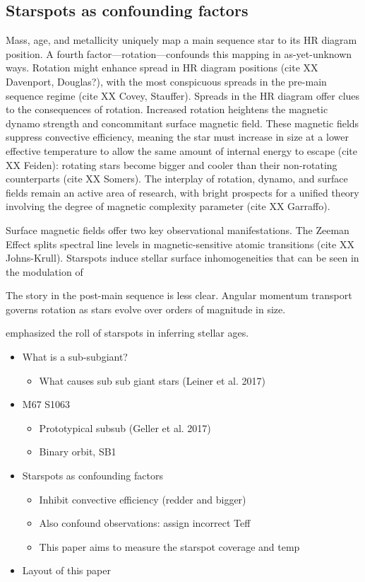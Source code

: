 \documentclass[twocolumn]{emulateapj}%
\begin{document}
\subsection{Starspots as confounding factors}
Mass, age, and metallicity uniquely map a main sequence star to its HR diagram position.  A fourth factor---rotation---confounds this mapping in as-yet-unknown ways.  Rotation might enhance spread in HR diagram positions (cite XX Davenport, Douglas?), with the most conspicuous spreads in the pre-main sequence regime (cite XX Covey, Stauffer).  Spreads in the HR diagram offer clues to the consequences of rotation.  Increased rotation heightens the magnetic dynamo strength and concommitant surface magnetic field.  These magnetic fields suppress convective efficiency, meaning the star must increase in size at a lower effective temperature to allow the same amount of internal energy to escape (cite XX Feiden): rotating stars become bigger and cooler than their non-rotating counterparts (cite XX Somers).  The interplay of rotation, dynamo, and surface fields remain an active area of research, with bright prospects for a unified theory involving the degree of magnetic complexity parameter (cite XX Garraffo).

Surface magnetic fields offer two key observational manifestations.  The Zeeman Effect splits spectral line levels in magnetic-sensitive atomic transitions (cite XX Johns-Krull).  Starspots induce stellar surface inhomogeneities that can be seen in the modulation of

The story in the post-main sequence is less clear.  Angular momentum transport governs rotation  as stars evolve over orders of magnitude in size.


\citet{somers15} emphasized the roll of starspots in inferring stellar ages.

\begin{itemize}
\item What is a sub-subgiant?
  \begin{itemize}
  \item What causes sub sub giant stars (Leiner et al. 2017)
  \end{itemize}
\item M67 S1063
\begin{itemize}
  \item Prototypical subsub (Geller et al. 2017)
  \item Binary orbit, SB1
\end{itemize}
\item Starspots as confounding factors
\begin{itemize}
  \item Inhibit convective efficiency (redder and bigger)
  \item Also confound observations: assign incorrect Teff
  \item This paper aims to measure the starspot coverage and temp
\end{itemize}
\item Layout of this paper
\end{itemize}
\end{document}

